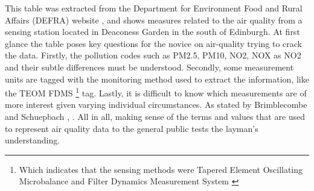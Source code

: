 This table was extracted from the  Department for Environment Food and Rural Affairs (DEFRA) website \cite{DepartmentforEnvironmenta}, and shows measures related to the air quality from a sensing station located in Deaconess Garden in the south of Edinburgh. At first glance the table poses key questions for the novice on air-quality trying to crack the data. Firstly, the pollution codes such as PM2.5, PM10, NO2, NOX as NO2 and their subtle differences must be understood. Secondly, some measurement units are tagged with the monitoring method used to extract the information, like the TEOM FDMS \footnote{Which indicates that the sensing methods were Tapered Element Oscillating Microbalance and Filter Dynamics Measurement System \cite{Quality2005}} tag. Lastly, it is difficult to know which measurements are of more interest given varying individual circumstances. As stated by Brimblecombe and Schuepbach \cite{P.Brimblecombe2008}, .  All in all, making sense of the terms and values that are used to represent air quality data to the general public tests the layman's understanding.
